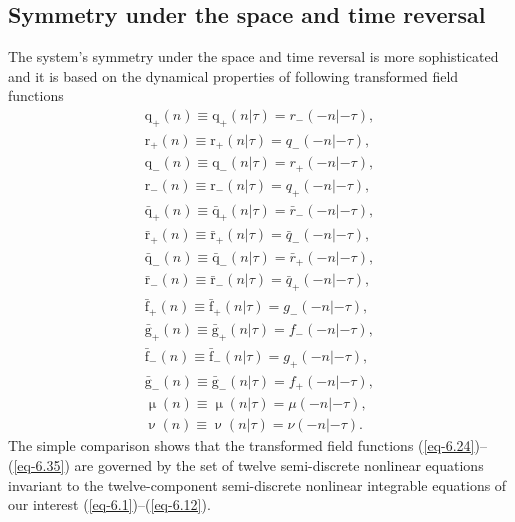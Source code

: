 \documentclass[pdftex]{sigma}
\numberwithin{equation}{section}
\begin{document}
\subsection{Symmetry under the space and time reversal}
The system's symmetry under the space and time reversal is more sophisticated and it is based on the dynamical properties of following transformed field functions
\begin{gather}\label{eq-6.24}
	\mathrm{q}_{+}(n)\equiv\mathrm{q}_{+}(n|\tau)=r_{-}(-n|-\tau),
\\ \label{eq-6.25}
	\mathrm{r}_{+}(n)\equiv\mathrm{r}_{+}(n|\tau)=q_{-}(-n|-\tau),
\\ \label{eq-6.26}
	\mathrm{q}_{-}(n)\equiv\mathrm{q}_{-}(n|\tau)=r_{+}(-n|-\tau),
\\ \label{eq-6.27}
	\mathrm{r}_{-}(n)\equiv\mathrm{r}_{-}(n|\tau)=q_{+}(-n|-\tau),
\\ \label{eq-6.28}
	\bar{\mathrm{q}}_{+}(n)\equiv\bar{\mathrm{q}}_{+}(n|\tau)=\bar{r}_{-}(-n|-\tau),
\\ \label{eq-6.29}
	\bar{\mathrm{r}}_{+}(n)\equiv\bar{\mathrm{r}}_{+}(n|\tau)=\bar{q}_{-}(-n|-\tau),
\\ \label{eq-6.30}
	\bar{\mathrm{q}}_{-}(n)\equiv\bar{\mathrm{q}}_{-}(n|\tau)=\bar{r}_{+}(-n|-\tau),
\\ \label{eq-6.31}
	\bar{\mathrm{r}}_{-}(n)\equiv\bar{\mathrm{r}}_{-}(n|\tau)=\bar{q}_{+}(-n|-\tau),
\\ \label{eq-6.32}
	\bar{\mathrm{f}}_{+}(n)\equiv\bar{\mathrm{f}}_{+}(n|\tau)=g_{-}(-n|-\tau),
\\ \label{eq-6.33}
	\bar{\mathrm{g}}_{+}(n)\equiv\bar{\mathrm{g}}_{+}(n|\tau)=f_{-}(-n|-\tau),
\\ \label{eq-6.34}
	\bar{\mathrm{f}}_{-}(n)\equiv\bar{\mathrm{f}}_{-}(n|\tau)=g_{+}(-n|-\tau),
\\ \label{eq-6.35}
	\bar{\mathrm{g}}_{-}(n)\equiv\bar{\mathrm{g}}_{-}(n|\tau)=f_{+}(-n|-\tau),
\\ %
\upmu (n)\equiv\upmu(n|\tau)=\mu(-n|-\tau), \nonumber
\\ %
	\upnu(n)\equiv\upnu(n|\tau)=\nu(-n|-\tau) . \nonumber
\end{gather}
The simple comparison shows that the transformed field functions (\ref{eq-6.24})--(\ref{eq-6.35}) are governed by the set of twelve semi-discrete nonlinear equations invariant to the twelve-component semi-discrete nonlinear integrable equations of our interest (\ref{eq-6.1})--(\ref{eq-6.12}).
\end{document}
